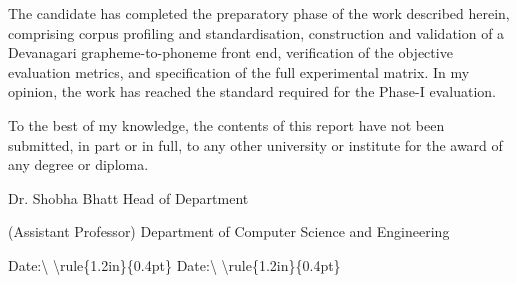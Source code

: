 \documentclass[12pt,a4paper]{article}
\begin{document}
The candidate has completed the preparatory phase of the work described herein, comprising corpus profiling and standardisation, construction and validation of a Devanagari grapheme-to-phoneme front end, verification of the objective evaluation metrics, and specification of the full experimental matrix. In my opinion, the work has reached the standard required for the Phase-I evaluation.

To the best of my knowledge, the contents of this report have not been submitted, in part or in full, to any other university or institute for the award of any degree or diploma.

\vspace{0.35in}

\noindent Dr. Shobha Bhatt \hfill Head of Department

\vspace{0.28in}

\noindent (Assistant Professor) \hfill Department of Computer Science and Engineering

\vspace{0.28in}

\noindent Date:\textbackslash{} \textbackslash{}rule\{1.2in\}\{0.4pt\} \hfill Date:\textbackslash{} \textbackslash{}rule\{1.2in\}\{0.4pt\}

\vspace{0.28in}

\clearpage

\renewcommand{\contentsname}{\normalfont\centering TABLE OF CONTENTS}
\begin{singlespace}
\tableofcontents
\end{singlespace}
\clearpage

\renewcommand{\listfigurename}{\normalfont\centering LIST OF FIGURES}
\begin{singlespace}
\listoffigures
{}
\vspace{0.25in}
\renewcommand{\listtablename}{\normalfont\centering LIST OF TABLES}
\listoftables
{}
\end{singlespace}
\clearpage
\end{document}
